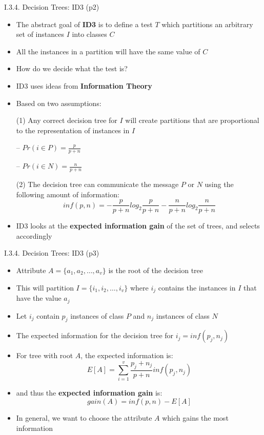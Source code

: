 \documentclass[handout]{beamer}
\newcommand{\strong}[1]{\textbf{\color{teal} #1}}
\begin{document}
\begin{frame}{I.3.4. Decision Trees: ID3 (p2)}
\begin{itemize}
\item The abstract goal of \strong{ID3} is to define a test $T$ which partitions an arbitrary set of instances $I$ into classes $C$
\item All the instances in a partition will have the same value of $C$
\item How do we decide what the test is?
\item ID3 uses ideas from \strong{Information Theory}
\item Based on two assumptions:
\item[(1)] Any correct decision tree for $I$ will create partitions that are proportional to the representation of instances in $I$
\item[--] $Pr( i \in P ) = \frac{p}{p+n}$ 
\item[--] $Pr( i \in N ) = \frac{n}{p+n}$
\item[(2)] The decision tree can communicate the message $P$ or $N$ using the following amount of information:
\[
inf(p,n) = - \frac{p}{p+n}log_2\frac{p}{p+n} - \frac{n}{p+n}log_2\frac{n}{p+n}
\]
\item ID3 looks at the \strong{expected information gain} of the set of trees, and selects accordingly
\end{itemize}
\end{frame}
\begin{frame}{I.3.4. Decision Trees: ID3 (p3)}
\begin{itemize}
\item Attribute $A = \{a_1,a_2,\ldots,a_v\}$ is the root of the decision tree
\item This will partition $I = \{i_1,i_2,\ldots,i_v\}$ where $i_j$ contains the instances in $I$ that have the value $a_j$
\item Let $i_j$ contain $p_j$ instances of class $P$ and $n_j$ instances of class $N$
\item The expected information for the decision tree for $i_j=inf(p_j,n_j)$
\item For tree with root $A$, the expected information is:
\[
E[A] = \sum_{i=1}^v{ \frac{ p_j + n_j }{ p + n } inf(p_j,n_j) }
\]
\item and thus the \strong{expected information gain} is:
\[
gain(A) = inf(p,n) - E[A]
\]
\item In general, we want to choose the attribute $A$ which gains the most information
\end{itemize}
\end{frame}
\end{document}
